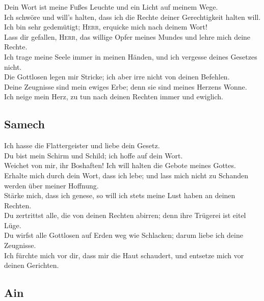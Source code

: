  Dein Wort ist meine Fußes Leuchte und ein Licht auf
meinem Wege.\\
 Ich schwöre und will's halten, dass ich die Rechte
deiner Gerechtigkeit halten will.\\
 Ich bin sehr gedemütigt; \textsc{Herr}, erquicke mich
nach deinem Wort!\\
 Lass dir gefallen, \textsc{Herr}, das willige Opfer
meines Mundes und lehre mich deine Rechte.\\
 Ich trage meine Seele immer in meinen Händen, und ich
vergesse deines Gesetzes nicht.\\
 Die Gottlosen legen mir Stricke; ich aber irre nicht
von deinen Befehlen.\\
 Deine Zeugnisse sind mein ewiges Erbe; denn sie sind
meines Herzens Wonne.\\
 Ich neige mein Herz, zu tun nach deinen Rechten immer
und ewiglich.

\hypertarget{samech}{%
\subsection{Samech}\label{samech}}

 Ich hasse die Flattergeister und liebe dein Gesetz.\\
 Du bist mein Schirm und Schild; ich hoffe auf dein
Wort.\\
 Weichet von mir, ihr Boshaften! Ich will halten die
Gebote meines Gottes.\\
 Erhalte mich durch dein Wort, dass ich lebe; und lass
mich nicht zu Schanden werden über meiner Hoffnung.\\
 Stärke mich, dass ich genese, so will ich stets meine
Lust haben an deinen Rechten.\\
 Du zertrittst alle, die von deinen Rechten abirren;
denn ihre Trügerei ist eitel Lüge.\\
 Du wirfst alle Gottlosen auf Erden weg wie Schlacken;
darum liebe ich deine Zeugnisse.\\
 Ich fürchte mich vor dir, dass mir die Haut schaudert,
und entsetze mich vor deinen Gerichten.

\hypertarget{ain}{%
\subsection{Ain}\label{ain}}

